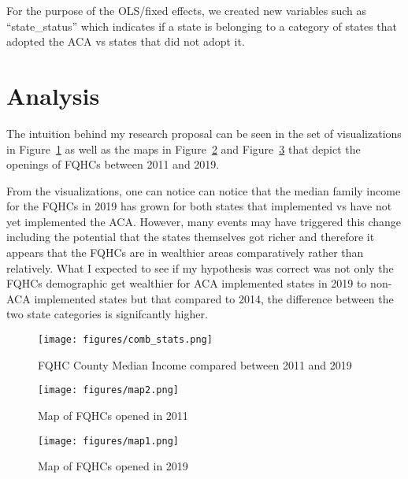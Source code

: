 \documentclass[12pt, ]{article}
\begin{document}
For the purpose of the OLS/fixed effects, we created new variables such
as ``state\_status'' which indicates if a state is belonging to a
category of states that adopted the ACA vs states that did not adopt it.

\hypertarget{analysis}{%
\section{Analysis}\label{analysis}}

The intuition behind my research proposal can be seen in the set of
visualizations in Figure~\ref{fig-1} as well as the maps in
Figure~\ref{fig-2} and Figure~\ref{fig-3} that depict the openings of
FQHCs between 2011 and 2019.

\newpage{}

From the visualizations, one can notice can notice that the median
family income for the FQHCs in 2019 has grown for both states that
implemented vs have not yet implemented the ACA. However, many events
may have triggered this change including the potential that the states
themselves got richer and therefore it appears that the FQHCs are in
wealthier areas comparatively rather than relatively. What I expected to
see if my hypothesis was correct was not only the FQHCs demographic get
wealthier for ACA implemented states in 2019 to non-ACA implemented
states but that compared to 2014, the difference between the two state
categories is signifcantly higher.

\begin{figure}[tbp]

{\centering \texttt{[image: figures/comb\_stats.png]}

}

\caption{\label{fig-1}FQHC County Median Income compared between 2011
and 2019}

\end{figure}

\begin{figure}[tbp]

{\centering \texttt{[image: figures/map2.png]}

}

\caption{\label{fig-2}Map of FQHCs opened in 2011}

\end{figure}

\begin{figure}[tbp]

{\centering \texttt{[image: figures/map1.png]}

}

\caption{\label{fig-3}Map of FQHCs opened in 2019}

\end{figure}
\end{document}
